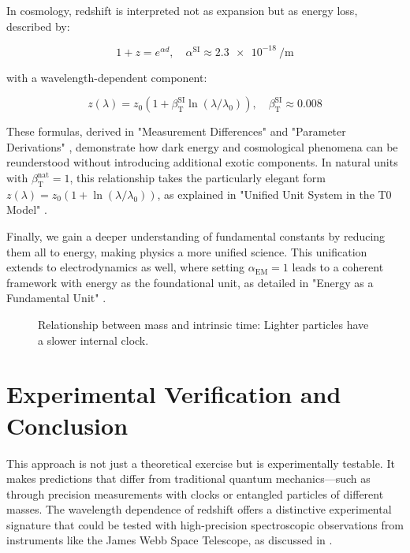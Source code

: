 \documentclass[a4paper,12pt]{article}
\newcommand{\Tfield}{T(x)}
\newcommand{\betaT}{\beta_{\text{T}}}
\newcommand{\alphaEM}{\alpha_{\text{EM}}}
\begin{document}
	In cosmology, redshift is interpreted not as expansion but as energy loss, described by:
	
	\begin{equation}
		1 + z = e^{\alpha d}, \quad \alpha^{\text{SI}} \approx \SI{2.3e-18}{\per\meter}
	\end{equation}
	
	with a wavelength-dependent component:
	
	\begin{equation}
		z(\lambda) = z_0 (1 + \betaT^{\text{SI}} \ln(\lambda/\lambda_0)), \quad \betaT^{\text{SI}} \approx 0.008
	\end{equation}
	
	These formulas, derived in "Measurement Differences" \cite{pascher_messdifferenzen_2025} and "Parameter Derivations" \cite{pascher_params_2025}, demonstrate how dark energy and cosmological phenomena can be reunderstood without introducing additional exotic components. In natural units with \(\betaT^{\text{nat}} = 1\), this relationship takes the particularly elegant form \(z(\lambda) = z_0 (1 + \ln(\lambda/\lambda_0))\), as explained in "Unified Unit System in the T0 Model" \cite{pascher_alphabeta_2025}.
	
	Finally, we gain a deeper understanding of fundamental constants by reducing them all to energy, making physics a more unified science. This unification extends to electrodynamics as well, where setting \(\alphaEM = 1\) leads to a coherent framework with energy as the foundational unit, as detailed in "Energy as a Fundamental Unit" \cite{pascher_alpha_2025}.
	
	\begin{figure}[h]
		\centering
		\caption{Relationship between mass and intrinsic time: Lighter particles have a slower internal clock.}
	\end{figure}
	
	\section{Experimental Verification and Conclusion}
	
	This approach is not just a theoretical exercise but is experimentally testable. It makes predictions that differ from traditional quantum mechanics—such as through precision measurements with clocks or entangled particles of different masses. The wavelength dependence of redshift offers a distinctive experimental signature that could be tested with high-precision spectroscopic observations from instruments like the James Webb Space Telescope, as discussed in \cite{pascher_messdifferenzen_2025}.
	
\end{document}
